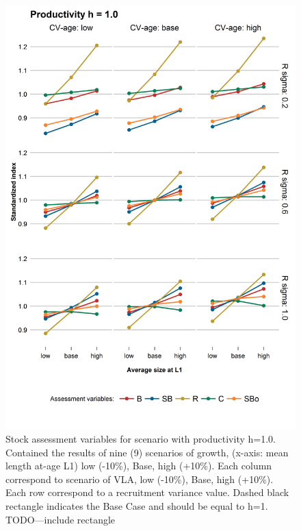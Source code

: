 \begin{figure}[hbtp]
	\begin{center}
\includegraphics[width=0.70\columnwidth]{figures/steepness-10-estado.png}
  \end{center}
\caption{Stock assessment variables for scenario with productivity h=1.0. Contained the results of nine (9) scenarios of growth, (x-axis: mean length at-age L1) low (-10\%), Base, high (+10\%). Each column correspond to scenario of VLA, low (-10\%), Base, high (+10\%). Each row correspond to a recruitment variance value. Dashed black rectangle indicates the Base Case and should be equal to h=1. TODO---include rectangle}
\label{figure1}
\end{figure}


